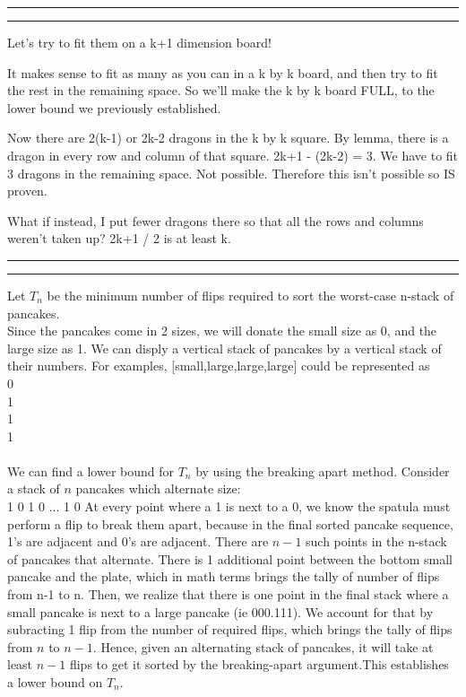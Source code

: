 \documentclass[11pt]{article}
\newcounter{questionCounter}
\newcounter{partCounter}[questionCounter]
\newenvironment{question}[2][\arabic{questionCounter}]{%
    \setcounter{partCounter}{0}%
    \vspace{.25in} \hrule \vspace{0.5em}%
        \noindent{\bf #2}%
    \vspace{0.8em} \hrule \vspace{.10in}%
    \addtocounter{questionCounter}{1}%
}{}
\begin{document}
\begin{question}{Dragon Chess}
Let's try to fit them on a k+1 dimension board!

It makes sense to fit as many as you can in a k by k board, and then try to fit the rest in the remaining space. So we'll make the k by k board FULL, to the lower bound we previously established.

Now there are 2(k-1) or 2k-2 dragons in the k by k square. By lemma, there is a dragon in every row and column of that square. 2k+1 - (2k-2) = 3. We have to fit 3 dragons in the remaining space. Not possible. Therefore this isn't possible so IS proven.

What if instead, I put fewer dragons there so that all the rows and columns weren't taken up? 2k+1 / 2 is at least k.


\end{question}
\begin{question}{Post Puzzle Pancake Party}
Let $T_n$ be the minimum number of flips required to sort the worst-case n-stack of pancakes.\\
Since the pancakes come in 2 sizes, we will donate the small size as 0, and the large size as 1. We can disply a vertical stack of pancakes by a vertical stack of their numbers. For examples, [small,large,large,large] could be represented as \\
0\\
1\\
1\\
1\\
\\
We can find a lower bound for $T_n$ by using the breaking apart method. Consider a stack of $n$ pancakes which alternate size:\\
1
0
1
0
...
1
0
At every point where a 1 is next to a 0, we know the spatula must perform a flip to break them apart, because in the final sorted pancake sequence, 1's are adjacent and 0's are adjacent. There are $n-1$ such points in the n-stack of pancakes that alternate. There is 1 additional point between the bottom small pancake and the plate, which in math terms brings the tally of number of flips from n-1 to n. Then, we realize that there is one point in the final stack where a small pancake is next to a large pancake (ie 000.111). We account for that by subracting 1 flip from the number of required flips, which brings the tally of flips from $n$ to $n-1$. Hence, given an alternating stack of pancakes, it will take at least $n-1$ flips to get it sorted by the breaking-apart argument.This establishes a lower bound on $T_n$.
\\

\end{question}
\end{document}
